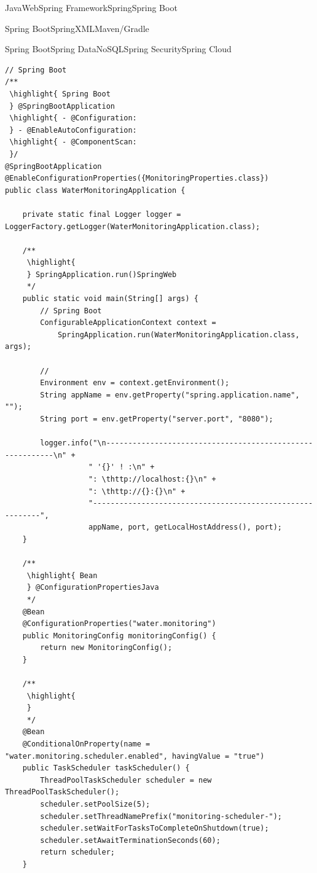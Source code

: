 JavaWebSpring FrameworkSpringSpring
Boot\important{}\important{}

Spring
Boot\important{}SpringXML\important{}Maven/Gradle\important{}

Spring Boot\important{}Spring DataNoSQL\important{}Spring
Security\important{}Spring Cloud\important{}

\begin{lstlisting}[style=java]
// Spring Boot
/**
 \highlight{ Spring Boot
 } @SpringBootApplication
 \highlight{ - @Configuration: 
 } - @EnableAutoConfiguration: 
 \highlight{ - @ComponentScan: 
 }/
@SpringBootApplication
@EnableConfigurationProperties({MonitoringProperties.class})
public class WaterMonitoringApplication {
    
    private static final Logger logger = LoggerFactory.getLogger(WaterMonitoringApplication.class);
    
    /**
     \highlight{ 
     } SpringApplication.run()SpringWeb
     */
    public static void main(String[] args) {
        // Spring Boot
        ConfigurableApplicationContext context = 
            SpringApplication.run(WaterMonitoringApplication.class, args);
        
        // 
        Environment env = context.getEnvironment();
        String appName = env.getProperty("spring.application.name", "");
        String port = env.getProperty("server.port", "8080");
        
        logger.info("\n----------------------------------------------------------\n" +
                   " '{}' ! :\n" +
                   ": \thttp://localhost:{}\n" +
                   ": \thttp://{}:{}\n" +
                   "----------------------------------------------------------",
                   appName, port, getLocalHostAddress(), port);
    }
    
    /**
     \highlight{ Bean
     } @ConfigurationPropertiesJava
     */
    @Bean
    @ConfigurationProperties("water.monitoring")
    public MonitoringConfig monitoringConfig() {
        return new MonitoringConfig();
    }
    
    /**
     \highlight{ 
     } 
     */
    @Bean
    @ConditionalOnProperty(name = "water.monitoring.scheduler.enabled", havingValue = "true")
    public TaskScheduler taskScheduler() {
        ThreadPoolTaskScheduler scheduler = new ThreadPoolTaskScheduler();
        scheduler.setPoolSize(5);
        scheduler.setThreadNamePrefix("monitoring-scheduler-");
        scheduler.setWaitForTasksToCompleteOnShutdown(true);
        scheduler.setAwaitTerminationSeconds(60);
        return scheduler;
    }
    

\end{lstlisting}
